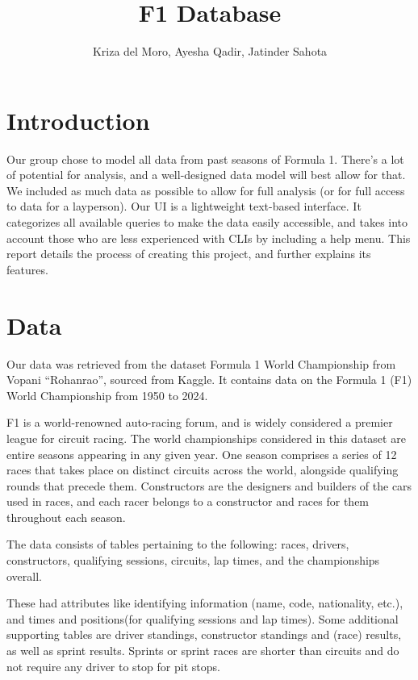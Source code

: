 \documentclass[]{article}
\title{F1 Database}
\author{Kriza del Moro, Ayesha Qadir, Jatinder Sahota}
\begin{document}
\maketitle
\newpage
\tableofcontents

\newpage

\section{Introduction}
Our group chose to model all data from past seasons of Formula 1. There's a lot of potential for analysis, and a well-designed data model will best allow for that. We included as much data as possible to allow for full analysis (or for full access to data for a layperson). Our UI is a lightweight text-based interface. It categorizes all available queries to make the data easily accessible, and takes into account those who are less experienced with CLIs by including a help menu. This report details the process of creating this project, and further explains its features.

\section{Data}
Our data was retrieved from the dataset Formula 1 World Championship from Vopani “Rohanrao”, sourced from Kaggle. It contains data on the Formula 1 (F1) World Championship from 1950 to 2024. 

F1 is a world-renowned auto-racing forum, and is widely considered a premier league for circuit racing. The world championships considered in this dataset are entire seasons appearing in any given year. One season comprises a series of 12 races that takes place on distinct circuits across the world, alongside qualifying rounds that precede them. Constructors are the designers and builders of the cars used in races, and each racer belongs to a constructor and races for them throughout each season.

The data consists of tables pertaining to the following: races, drivers, constructors, qualifying sessions, circuits, lap times, and the championships overall.

These had attributes like identifying information (name, code, nationality, etc.), and times and positions(for qualifying sessions and lap times). Some additional supporting tables are driver standings, constructor standings and (race) results, as well as sprint results. Sprints or sprint races are shorter than circuits and do not require any driver to stop for pit stops. 
\end{document}
